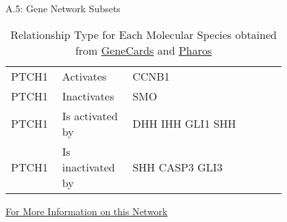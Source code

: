 \begin{alertblock}{A.5: Gene Network Subsets}
\begin{table}[H]
\begin{tabular}{p{0.1\linewidth}p{0.2\linewidth}p{0.4\linewidth}p{0.1\linewidth}}
		\hline
		\hline
		PTCH1 & Activates & CCNB1 \\ 
		PTCH1 & Inactivates & SMO \\
		PTCH1 & Is activated by & DHH IHH GLI1 SHH \\
		PTCH1 & Is inactivated by & SHH CASP3 GLI3 \\ 
	\hline
\end{tabular}
\caption{Relationship Type for Each Molecular Species obtained from \href{www.genecards.org}{GeneCards} and \href{https://pharos.nih.gov/idg/index}{Pharos}}
\end{table}
\vspace{6pt}
\href{http://www.genecards.org}{For More Information on this Network}
\end{alertblock}